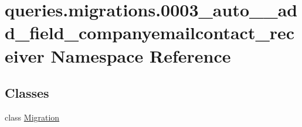 \hypertarget{namespacequeries_1_1migrations_1_10003__auto____add__field__companyemailcontact__receiver}{\section{queries.\-migrations.0003\-\_\-auto\-\_\-\-\_\-add\-\_\-field\-\_\-companyemailcontact\-\_\-receiver Namespace Reference}
\label{namespacequeries_1_1migrations_1_10003__auto____add__field__companyemailcontact__receiver}
}
\subsection*{Classes}
\begin{DoxyCompactItemize}
\item 
class \hyperlink{classqueries_1_1migrations_1_10003__auto____add__field__companyemailcontact__receiver_1_1_migration}{Migration}
\end{DoxyCompactItemize}
